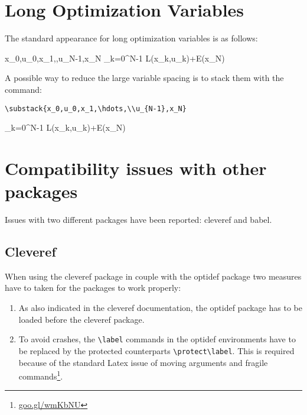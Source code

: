 \documentclass[a4paper]{article}
\begin{document}
\section{Long Optimization Variables}
The standard appearance for long optimization variables is as follows:

\begin{minie}
	{x_0,u_0,x_1,\hdots,u_{N-1},x_N}
	{\sum_{k=0}^{N-1} L(x_k,u_k)\!\!+\!\!E(x_N)\label{OCPobj}}
	{\label{eq:OCP}}{}
\end{minie}

\noindent A possible way to reduce the large variable spacing is to stack them with the command: \begin{verbatim}
\substack{x_0,u_0,x_1,\hdots,\\u_{N-1},x_N}
\end{verbatim}

\begin{minie}
	{}
	{\sum_{k=0}^{N-1} L(x_k,u_k)\!\!+\!\!E(x_N)\label{OCPobj}}
	{\label{eq:OCP}}{}
\end{minie}

\section{Compatibility issues with other packages}
Issues with two different packages have been reported: cleveref and babel.
\subsection{Cleveref}
When using the cleveref package in couple with the optidef package two measures have to taken for the packages to work properly:

\begin{enumerate}
	\item As also indicated in the cleveref documentation, the optidef package has to be loaded before the cleveref package.
	\item To avoid crashes, the \verb|\label| commands in the optidef environments have to be replaced by the protected counterparts \verb|\protect\label|. This is required because of the standard Latex issue of moving arguments and fragile commands\footnote{\url{goo.gl/wmKbNU}}.
\end{enumerate} 
\end{document}
